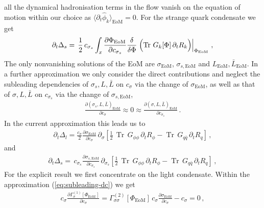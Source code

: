 \documentclass[%
reprint,
superscriptaddress,
showpacs,preprintnumbers,
 amsmath,amssymb,
 aps,
prd,
]{revtex4-1}
\newcommand{\Tr}{\ensuremath{\operatorname{Tr}}}
\def\eq#1{(\ref{#1})}
\begin{document}
all the dynamical hadronisation terms in the flow vanish on the
equation of motion within our choice as
$\langle \partial_t \hat{\phi}_k\rangle_{\textrm{EoM} }=0$. For the
strange quark condensate we get
%
\begin{align} 
  \partial_t \Delta_{s} 
  =\,\frac12 \, c_{\sigma_s}
  \int_x \frac{\partial \Phi_{\textrm{EoM}}}{
  \partial {c_{\sigma_s}}} \frac{
  \delta}{\delta \Phi}
  \left. \Bigl(\Tr\,G_k[\Phi] \,\partial_t R_k
  \Bigr)\right|_{\Phi_\textrm{EoM}} \,, 
\label{eq:FlowDeltasc}\end{align}
The only nonvanishing solutions of the EoM are $\sigma_\textrm{EoM}$,
$\sigma_{s, \textrm{EoM}}$ and
$L_\textrm{EoM}, \bar L_{\textrm{EoM}}$. In a further approximation we
only consider the direct contributions and neglect the subleading
dependencies of $\sigma_s, L, \bar L$ on $c_\sigma$ via the change of
$\sigma_\textrm{EoM}$, as well as that of $\sigma, L, \bar L$ on
$c_{\sigma_s}$ via the change of $\sigma_{s,\textrm{EoM}}$,
%
\begin{align}\label{eq:subleading-dc}
  \frac{ \partial (\sigma_s,L,\bar L)_\textrm{EoM} }{
  \partial c_\sigma}
  \approx 0\approx 
  \frac{ \partial (\sigma,L,\bar L)_\textrm{EoM} }{
  \partial c_{\sigma_s}}\,.
\end{align}
%
In the current approximation this leads us to
%
\begin{align}\label{eq:dtDeltalcsimple}
  \partial_t \Delta_l =\frac{c_\sigma}{2}
  \frac{\partial\sigma_{\textrm{EoM}}}{\partial {c_\sigma}}\,
  \partial_\sigma 
  \left[  \frac12 \, \Tr \,
  G_{\phi\phi}\,\partial_t R_\phi  - \Tr \, G_{q\bar q}\,
  \partial_t R_q \right]\,,
\end{align}
%
and
\begin{align}\label{eq:dtDeltascsimple}
  \partial_t \Delta_s = \, c_{\sigma_s}
  \frac{\partial\sigma_{s,\textrm{EoM}}}{\partial c_{\sigma_s}}\,
  \partial_{\sigma_s} 
  \left[  \frac12 \, \Tr \,
  G_{\phi\phi}\,\partial_t R_\phi - \Tr \, G_{q\bar q}\,\partial_t R_q\right]\,,
\end{align}
For the explicit result we first concentrate on the light
condensate. Within the approximation \eq{eq:subleading-dc} we get
%
\begin{align}\label{eq:dcsigma}
  c_{\sigma} \frac{\partial  \Gamma^{(1)}_{\sigma}[
  \Phi_\textrm{EoM}]}{\partial c_\sigma} =
  \Gamma^{(2)}_{\sigma \sigma}[\Phi_\textrm{EoM}]
  \,c_\sigma \frac{\partial
  \sigma_{\textrm{EoM}}}{\partial {c_\sigma}}  -
  c_\sigma  =0 \,, 
\end{align}
\end{document}
